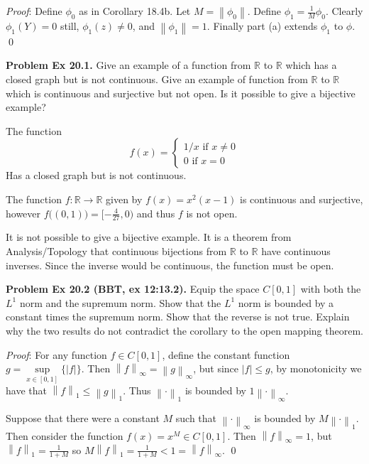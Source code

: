 \documentclass[12pt]{article}
\newcommand{\problem}[1]{\hspace{-4 ex} \large \textbf{Problem #1} }
\newcommand{\norm}[1]{\left\lVert#1\right\rVert}
\renewenvironment{proof}{\hspace{-4 ex} \emph{Proof}:}{\qed}
\newcommand{\RR}{\mathbb{R}}
\begin{document}
	\begin{proof}
		Define $\phi_0$ as in Corollary 18.4b. Let $M = \norm{\phi_0}$. Define $\phi_1 = \tfrac{1}{M}\phi_0$. Clearly $\phi_1(Y)=0$ still, $\phi_1(z)\neq 0$, and $\norm{\phi_1}=1$. Finally part (a) extends $\phi_1$ to $\phi$.
	\end{proof}

\bigbreak
\problem{Ex 20.1.} Give an example of a function from $\RR$ to $\RR$ which has a closed graph but is not continuous. Give an example of function from $\RR$ to $\RR$ which is continuous and surjective but not open. Is it possible to give a bijective example? \bigbreak

	The function 
	$$
	f(x) = \begin{cases}
		1/x \text{\ \ \ if $x \neq 0$} \\
		0 \text{\ \ \ if $x = 0$}
	\end{cases}
	$$
	Has a closed graph but is not continuous. \bigbreak
	
	The function $f: \RR \to \RR$ given by $f(x) = x^2(x-1)$ is continuous and surjective, however $f\big( (0,1) \big) = [-\tfrac{4}{27},0)$ and thus $f$ is not open. \bigbreak
	
	It is not possible to give a bijective example. It is a theorem from Analysis/Topology that continuous bijections from $\RR$ to $\RR$ have continuous inverses. Since the inverse would be continuous, the function must be open. 

\bigbreak
\problem{Ex 20.2 (BBT, ex 12:13.2).} Equip the space $C[0,1]$ with both the $L^1$ norm and the supremum norm. Show that the $L^1$ norm is bounded by a constant times the supremum norm. Show that the reverse is not true. Explain why the two results do not contradict the corollary to the open mapping theorem. \bigbreak

	\begin{proof}
		For any function $f \in C[0,1]$, define the constant function $g = \sup\limits_{x \in [0,1]}\{\vert f \vert \}$. Then $\norm{f}_\infty = \norm{g}_\infty$, but since $\vert f \vert  \leq g$, by monotonicity we have that $\norm{f}_1 \leq \norm{g}_1$. Thus $\norm{\cdot}_1$ is bounded by $1\norm{\cdot}_\infty$. \bigbreak
		
		Suppose that there were a constant $M$ such that $\norm{\cdot}_\infty$ is bounded by $M\norm{\cdot}_1$. Then consider the function $f(x) = x^{M} \in C[0,1]$. Then $\norm{f}_\infty = 1$, but $\norm{f}_1 = \tfrac{1}{1+M}$ so $M \norm{f}_1 = \tfrac{1}{1+M} < 1 = \norm{f}_\infty$.
	\end{proof}
	
\end{document}
